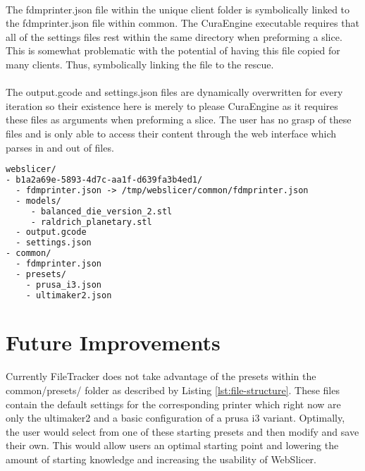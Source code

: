 \paragraph{}
The fdmprinter.json file within the unique client folder is symbolically linked to the fdmprinter.json file within common. 
The CuraEngine executable requires that all of the settings files rest within the same directory when preforming a slice. 
This is somewhat problematic with the potential of having this file copied for many clients. 
Thus, symbolically linking the file to the rescue.

\paragraph{}
The output.gcode and settings.json files are dynamically overwritten for every iteration so their existence here is merely to please CuraEngine as it requires these files as arguments when preforming a slice. 
The user has no grasp of these files and is only able to access their content through the web interface which parses in and out of files.

\begin{lstlisting}[language=html, style=thesiscode, label={lst:file-structure}, caption=WebSlicer's underlying file structure supported by FileTracker.]
webslicer/
- b1a2a69e-5893-4d7c-aa1f-d639fa3b4ed1/
  - fdmprinter.json -> /tmp/webslicer/common/fdmprinter.json
  - models/
     - balanced_die_version_2.stl
     - raldrich_planetary.stl
  - output.gcode
  - settings.json
- common/
  - fdmprinter.json
  - presets/
    - prusa_i3.json
    - ultimaker2.json
\end{lstlisting}

\section{Future Improvements}
\paragraph{}
Currently FileTracker does not take advantage of the presets within the common/presets/ folder as described by Listing \ref{lst:file-structure}. 
These files contain the default settings for the corresponding printer which right now are only the ultimaker2 and a basic configuration of a prusa i3 variant. 
Optimally, the user would select from one of these starting presets and then modify and save their own.
This would allow users an optimal starting point and lowering the amount of starting knowledge and increasing the usability of WebSlicer.

